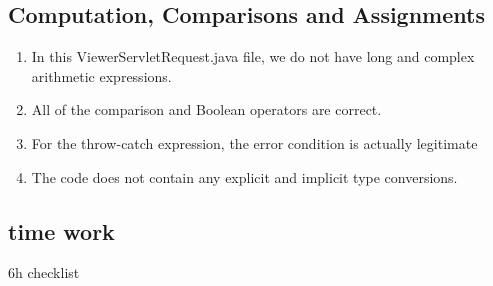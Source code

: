 \documentclass{article}
\begin{document}
\subsection{Computation, Comparisons and Assignments}
\begin{enumerate}
	\item In this ViewerServletRequest.java file, we do not have long and complex arithmetic expressions.
	\item All of the comparison and Boolean operators are correct.
	\item For the throw-catch expression, the error condition is actually legitimate
	\item The code does not contain any explicit and implicit type conversions.
\end{enumerate}

\subsection{time work}
6h checklist
\end{document}
